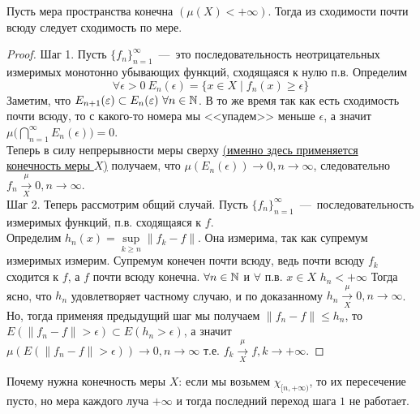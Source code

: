 \begin{theorem}[Лебега]
    Пусть мера пространства конечна $\left(\mu (X) < +\infty\right)$. Тогда из сходимости почти всюду следует сходимость по мере.
\end{theorem}
\begin{proof}
     Шаг 1. Пусть $\{f_n\}_{n = 1}^\infty$~---~это последовательность неотрицательных измеримых монотонно убывающих функций, сходящаяся к нулю п.в. Определим $$\forall \epsilon > 0 \ E_n(\epsilon) = \{x \in X \mid f_n(x) \geq \epsilon\}$$ Заметим, что $E_{n + 1}(\varepsilon) \subset E_n(\varepsilon)\  \forall n \in \mathbb{N}$. В то же время так как есть сходимость почти всюду, то с какого-то номера мы <<упадем>> меньше $\epsilon$, а значит $\mu \Big(\bigcap\limits_{n = 1}^\infty E_n(\epsilon) \Big) = 0$.\\
     Теперь в силу непрерывности меры сверху \hyperlink{upper_continious}{(именно здесь применяется конечность меры $X$)} получаем, что $\mu(E_n(\epsilon)) \rightarrow 0, n \rightarrow \infty$, следовательно $f_n \xrightarrow[X]{\mu} 0, n \rightarrow \infty$. \\
    Шаг 2. Теперь рассмотрим общий случай. Пусть $\{f_n\}_{n = 1}^\infty$~---~последовательность измеримых функций, п.в. сходящаяся к $f$. \\
    Определим $h_n(x ) = \sup\limits_{k \geq n}\|f_k - f\|$. Она измерима, так как супремум измеримых измерим. Супремум конечен почти всюду, ведь почти всюду $f_k$ сходится к $f$, а $f$ почти всюду конечна. $\forall n \in \mathbb{N}$  и  $\forall$ п.в. $x \in X$ $h_n < +\infty$
    Тогда ясно, что $h_n$ удовлетворяет частному случаю, и по доказанному $h_n \xrightarrow[X]{\mu} 0, n \rightarrow \infty$. Но, тогда применяя предыдущий шаг мы получаем  $\|f_n - f\| \leq h_n$, то $E(\|f_n - f\| > \epsilon) \subset E(h_n > \epsilon)$, а значит $\mu(E(\|f_n - f\| > \epsilon)) \rightarrow 0, n \rightarrow \infty$ т.е. $f_k \xrightarrow[X]{\mu} f, k \rightarrow +\infty$.
\end{proof}

\begin{counterexample}
    Почему нужна конечность меры $X$: если мы возьмем $\chi_{[n, +\infty)}$, то их пересечение пусто, но мера каждого луча $+\infty$ и тогда последний переход шага $1$ не работает.
\end{counterexample}